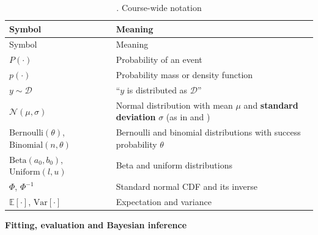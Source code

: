 \begin{longtable}[]{@{}
  >{\raggedright\arraybackslash}p{}
  >{\raggedright\arraybackslash}p{}@{}}
\caption{. Course-wide notation}\tabularnewline
\toprule\noalign{}
\begin{minipage}[b]{\linewidth}\raggedright
Symbol
\end{minipage} & \begin{minipage}[b]{\linewidth}\raggedright
Meaning
\end{minipage} \\
\midrule\noalign{}
\endfirsthead
\toprule\noalign{}
\begin{minipage}[b]{\linewidth}\raggedright
Symbol
\end{minipage} & \begin{minipage}[b]{\linewidth}\raggedright
Meaning
\end{minipage} \\
\midrule\noalign{}
\endhead
\bottomrule\noalign{}
\endlastfoot
\(P(\cdot)\) & Probability of an event \\
\(p(\cdot)\) & Probability mass or density function \\
\(y \sim \mathcal{D}\) & ``\(y\) is distributed as \(\mathcal{D}\)'' \\
\(\mathcal{N}(\mu, \sigma)\) & Normal distribution with mean \(\mu\) and
\textbf{standard deviation} \(\sigma\) (as in and ) \\
\(\mathrm{Bernoulli}(\theta)\), \(\mathrm{Binomial}(n, \theta)\) &
Bernoulli and binomial distributions with success probability
\(\theta\) \\
\(\mathrm{Beta}(a_0, b_0)\), \(\mathrm{Uniform}(l, u)\) & Beta and
uniform distributions \\
\(\Phi\), \(\Phi^{-1}\) & Standard normal CDF and its inverse \\
\(\mathbb{E}[\cdot]\), \(\mathrm{Var}[\cdot]\) & Expectation and
variance \\
\end{longtable}

\textbf{Fitting, evaluation and Bayesian inference}

